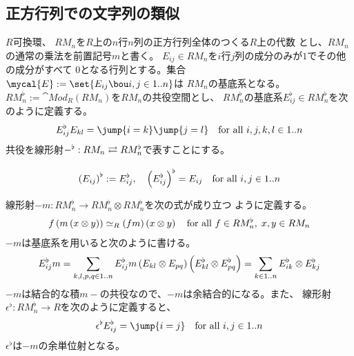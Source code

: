 {\subsection{正方行列での文字列の類似}\label{s2:正方行列での文字列の類似} %
	$R$可換環、 $RM_n$を$R$上の$n$行$n$列の正方行列全体のつくる$R$上の代数
	とし、$RM_n$の通常の乗法を前置記号$m$と書く。
	$E_{ij}\in RM_n$を$i$行$j$列の成分のみが$1$でその他の成分がすべて
	$0$となる行列とする。集合$\mycal{E}:=\set{E_{ij}\bou i,j\in1..n}$は
	$RM_n$の基底系となる。
	$RM_n^\flat:=\cat{Mod}_R(RM_n)$を$RM_n$の共役空間とし、
	$RM_n^\flat$の基底系$E_{ij}^\flat\in RM_n^\flat$を次のように定義する。
	\begin{equation*}\begin{split}
		E_{ij}^\flat E_{kl} = \jump{i=k}\jump{j=l}
		\quad\text{for all } i,j,k,l\in1..n
	\end{split}\end{equation*}
	共役を線形射$-^\flat:RM_n\underset{}{\overset{}{\rightleftarrows}} RM_n^\flat$で表すことにする。
	\begin{equation*}\begin{split}
		\left({E_{ij}}\right)^\flat := E_{ij}^\flat,\quad
		\left({E_{ij}^\flat}\right)^\flat = E_{ij} \quad\text{for all } i,j\in1..n
	\end{split}\end{equation*}

	線形射$-m:RM_n^\flat\to RM_n^\flat\otimes RM_n^\flat$を次の式が成り立つ
	ように定義する。
	\begin{equation*}\begin{split}
		f\left({m\left({x\otimes y}\right)}\right) \simeq_R (fm)\left({x\otimes y}\right)
		\quad\text{for all } f\in RM_n^\flat,\; x,y\in RM_n
	\end{split}\end{equation*}
	$-m$は基底系を用いると次のように書ける。
	\begin{equation*}\begin{split}
		E_{ij}^\flat m = \sum_{k,l,p,q\in1..n} E_{ij}^\flat m
		\left({E_{kl}\otimes E_{pq}}\right)\left({E_{kl}^\flat\otimes E_{pq}^\flat}\right)
		= \sum_{k\in1..n} E_{ik}^\flat\otimes E_{kj}^\flat
	\end{split}\end{equation*}
	$-m$は結合的な積$m-$の共役なので、$-m$は余結合的になる。また、
	線形射$\epsilon^\flat:RM_n^\flat\to R$を次のように定義すると、
	\begin{equation*}\begin{split}
		\epsilon^\flat E_{ij}^\flat = \jump{i=j} 
		\quad\text{for all } i,j\in1..n
	\end{split}\end{equation*}
	$\epsilon^\flat$は$-m$の余単位射となる。

}

